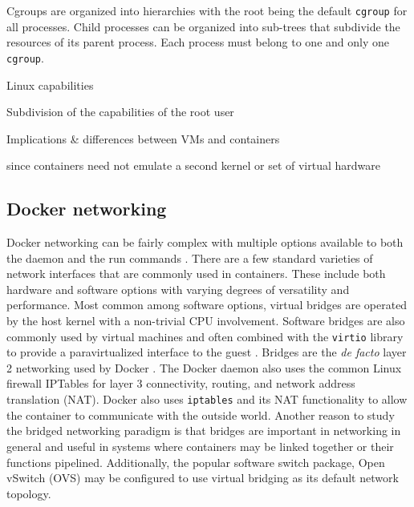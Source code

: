 Cgroups are organized into hierarchies with the root being the default \texttt{cgroup} for all processes.  Child processes can be organized into sub-trees that subdivide the resources of its parent process.  Each process must belong to one and only one \texttt{cgroup}. 

Linux capabilities

Subdivision of the capabilities of the root user

Implications \& differences between VMs and containers

since containers need not emulate a second kernel or set of virtual hardware

\subsection{Docker networking} %
\label{sub:dockernetworking}
Docker networking can be fairly complex with multiple options available to both the daemon and the run commands \autocite{dockernetworking1}.
There are a few standard varieties of network interfaces that are commonly used in containers.
These include both hardware and software options with varying degrees of versatility and performance.  
Most common among software options, virtual bridges are operated by the host kernel with a non-trivial CPU involvement. 
Software bridges are also commonly used by virtual machines and often combined with the \texttt{virtio} library to provide a paravirtualized interface to the guest \autocite{_virtio_1}. 
Bridges are the \emph{de facto} layer 2 networking used by Docker \autocite{dockernetworking1}.  
The Docker daemon also uses the common Linux firewall IPTables for layer 3 connectivity, routing, and network address translation (NAT).
Docker also uses \texttt{iptables} and its NAT functionality to allow the container to communicate with the outside world.
Another reason to study the bridged networking paradigm is that bridges are important in networking in general and useful in systems where containers may be linked together or their functions pipelined.
Additionally, the popular software switch package, Open vSwitch (OVS) may be configured to use virtual bridging as its default network topology.

